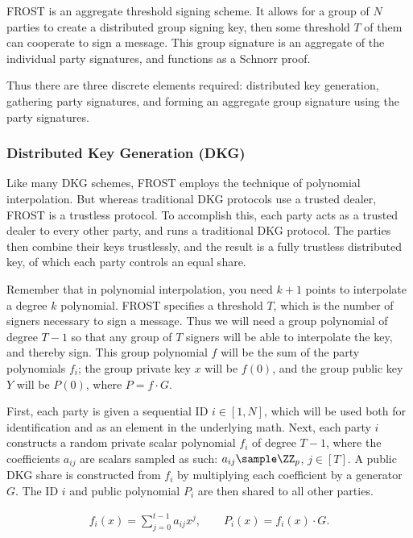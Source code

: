 \documentclass{article}
\theoremstyle{definition}
\theoremstyle{remark}
\begin{document}
FROST is an aggregate threshold signing scheme.  It allows for a group of $N$ parties to create a distributed group signing key, then some threshold $T$ of them can cooperate to sign a message.  This group signature is an aggregate of the individual party signatures, and functions as a Schnorr proof.

Thus there are three discrete elements required: distributed key generation, gathering party signatures, and forming an aggregate group signature using the party signatures.

\subsubsection{
  Distributed Key Generation (DKG)
}

Like many DKG schemes, FROST employs the technique of polynomial interpolation.  But whereas traditional DKG protocols use a trusted dealer, FROST is a trustless protocol.  To accomplish this, each party acts as a trusted dealer to every other party, and runs a traditional DKG protocol.  The parties then combine their keys trustlessly, and the result is a fully trustless distributed key, of which each party controls an equal share.

Remember that in polynomial interpolation, you need $k+1$ points to interpolate a degree $k$ polynomial.  FROST specifies a threshold $T$, which is the number of signers necessary to sign a message.  Thus we will need a group polynomial of degree $T-1$ so that any group of $T$ signers will be able to interpolate the key, and thereby sign.  This group polynomial $f$ will be the sum of the party polynomials $f_i$; the group private key $x$ will be $f(0)$, and the group public key $Y$ will be $P(0)$, where $P = f \cdot G$.

First, each party is given a sequential ID $i \in [1, N]$, which will be used both for identification and as an element in the underlying math.  Next, each party $i$ constructs a random private scalar polynomial $f_i$ of degree $T-1$, where the coefficients $a_{ij}$ are scalars sampled as such: $a_{ij} \sample \ZZ_p$, $j \in [T]$.  A public DKG share is constructed from $f_i$ by multiplying each coefficient by a generator $G$.  The ID $i$ and public polynomial $P_i$ are then shared to all other parties.

\begin{align}\label{equation:wsts-polynomial}
f_i(x) = \sum_{j=0}^{t-1} a_{ij}x^j, \qquad P_i(x) = f_{i}(x) \cdot G.
\end{align}
\end{document}
